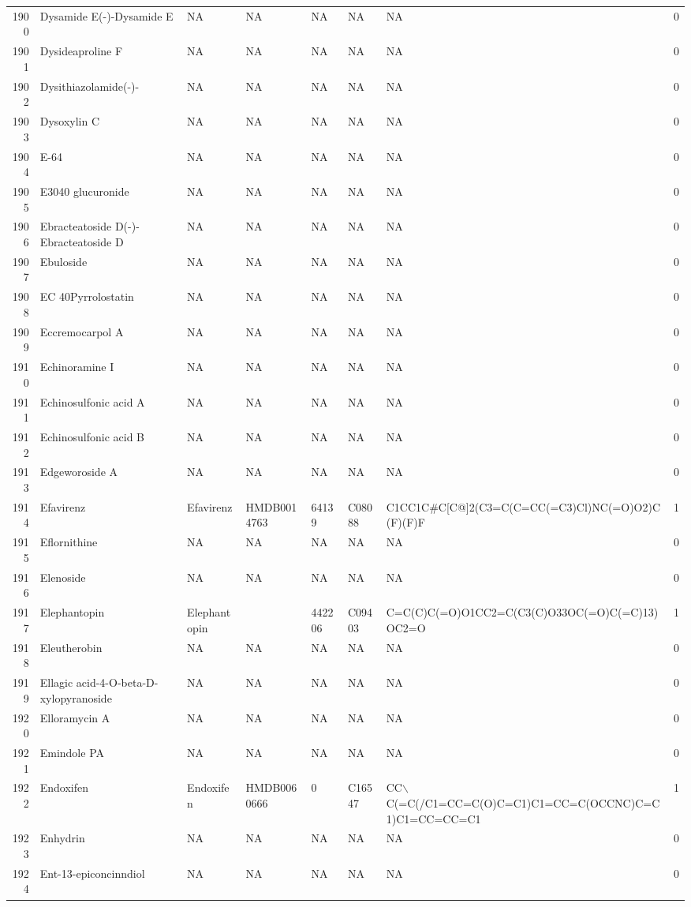 \documentclass[a4paper]{article}
\begin{document}
\begin{longtable}{rlllllll}
  1900 & Dysamide E(-)-Dysamide E & NA & NA & NA & NA & NA & 0 \\ 
  1901 & Dysideaproline F & NA & NA & NA & NA & NA & 0 \\ 
  1902 & Dysithiazolamide(-)- & NA & NA & NA & NA & NA & 0 \\ 
  1903 & Dysoxylin C & NA & NA & NA & NA & NA & 0 \\ 
  1904 & E-64 & NA & NA & NA & NA & NA & 0 \\ 
  1905 & E3040 glucuronide & NA & NA & NA & NA & NA & 0 \\ 
  1906 & Ebracteatoside D(-)-Ebracteatoside D & NA & NA & NA & NA & NA & 0 \\ 
  1907 & Ebuloside & NA & NA & NA & NA & NA & 0 \\ 
  1908 & EC 40Pyrrolostatin & NA & NA & NA & NA & NA & 0 \\ 
  1909 & Eccremocarpol A & NA & NA & NA & NA & NA & 0 \\ 
  1910 & Echinoramine I & NA & NA & NA & NA & NA & 0 \\ 
  1911 & Echinosulfonic acid A & NA & NA & NA & NA & NA & 0 \\ 
  1912 & Echinosulfonic acid B & NA & NA & NA & NA & NA & 0 \\ 
  1913 & Edgeworoside A & NA & NA & NA & NA & NA & 0 \\ 
  1914 & Efavirenz & Efavirenz & HMDB0014763 & 64139 & C08088 & C1CC1C\#C[C@]2(C3=C(C=CC(=C3)Cl)NC(=O)O2)C(F)(F)F & 1 \\ 
  1915 & Eflornithine & NA & NA & NA & NA & NA & 0 \\ 
  1916 & Elenoside & NA & NA & NA & NA & NA & 0 \\ 
  1917 & Elephantopin & Elephantopin &  & 442206 & C09403 & C=C(C)C(=O)O1CC2=C(C3(C)O33OC(=O)C(=C)13)OC2=O & 1 \\ 
  1918 & Eleutherobin & NA & NA & NA & NA & NA & 0 \\ 
  1919 & Ellagic acid-4-O-beta-D-xylopyranoside & NA & NA & NA & NA & NA & 0 \\ 
  1920 & Elloramycin A & NA & NA & NA & NA & NA & 0 \\ 
  1921 & Emindole PA & NA & NA & NA & NA & NA & 0 \\ 
  1922 & Endoxifen & Endoxifen & HMDB0060666 & 0 & C16547 & CC$\backslash$C(=C(/C1=CC=C(O)C=C1)C1=CC=C(OCCNC)C=C1)C1=CC=CC=C1 & 1 \\ 
  1923 & Enhydrin & NA & NA & NA & NA & NA & 0 \\ 
  1924 & Ent-13-epiconcinndiol & NA & NA & NA & NA & NA & 0 \\ 

\end{longtable}
\end{document}

